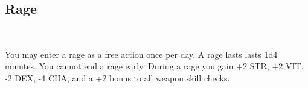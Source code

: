 \subsection*{Rage}\label{feat:rage}
 \\

You may enter a rage as a free action once per day. A rage lasts lasts 1d4 minutes. You
cannot end a rage early. During a rage you gain +2 STR, +2 VIT, -2 DEX, -4 CHA,
and a +2 bonus to all weapon skill checks.
